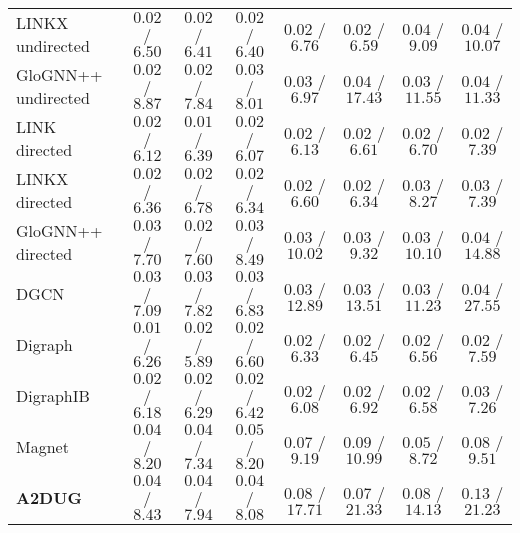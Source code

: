 \begin{table*}[t]
{\begin{tabular}{l|ccccccc}
LINKX undirected & $0.02$ / $6.50$ & $0.02$ / $6.41$ & $0.02$ / $6.40$ & $0.02$ / $6.76$ & $0.02$ / $6.59$ & $0.04$ / $9.09$ & $0.04$ / $10.07$ \\
GloGNN++ undirected & $0.02$ / $8.87$ & $0.02$ / $7.84$ & $0.03$ / $8.01$ & $0.03$ / $6.97$ & $0.04$ / $17.43$ & $0.03$ / $11.55$ & $0.04$ / $11.33$ \\ \midrule
LINK directed & $0.02$ / $6.12$ & $0.01$ / $6.39$ & $0.02$ / $6.07$ & $0.02$ / $6.13$ & $0.02$ / $6.61$ & $0.02$ / $6.70$ & $0.02$ / $7.39$ \\
LINKX directed & $0.02$ / $6.36$ & $0.02$ / $6.78$ & $0.02$ / $6.34$ & $0.02$ / $6.60$ & $0.02$ / $6.34$ & $0.03$ / $8.27$ & $0.03$ / $7.39$ \\
GloGNN++ directed & $0.03$ / $7.70$ & $0.02$ / $7.60$ & $0.03$ / $8.49$ & $0.03$ / $10.02$ & $0.03$ / $9.32$ & $0.03$ / $10.10$ & $0.04$ / $14.88$ \\ \midrule
DGCN & $0.03$ / $7.09$ & $0.03$ / $7.82$ & $0.03$ / $6.83$ & $0.03$ / $12.89$ & $0.03$ / $13.51$ & $0.03$ / $11.23$ & $0.04$ / $27.55$ \\
Digraph & $0.01$ / $6.26$ & $0.02$ / $5.89$ & $0.02$ / $6.60$ & $0.02$ / $6.33$ & $0.02$ / $6.45$ & $0.02$ / $6.56$ & $0.02$ / $7.59$ \\
DigraphIB & $0.02$ / $6.18$ & $0.02$ / $6.29$ & $0.02$ / $6.42$ & $0.02$ / $6.08$ & $0.02$ / $6.92$ & $0.02$ / $6.58$ & $0.03$ / $7.26$ \\
Magnet & $0.04$ / $8.20$ & $0.04$ / $7.34$ & $0.05$ / $8.20$ & $0.07$ / $9.19$ & $0.09$ / $10.99$ & $0.05$ / $8.72$ & $0.08$ / $9.51$ \\ \midrule
\textbf{A2DUG} & $0.04$ / $8.43$ & $0.04$ / $7.94$ & $0.04$ / $8.08$ & $0.08$ / $17.71$ & $0.07$ / $21.33$ & $0.08$ / $14.13$ & $0.13$ / $21.23$ \\
\bottomrule
\end{tabular}
}

\vspace{2mm}

\end{table*}
